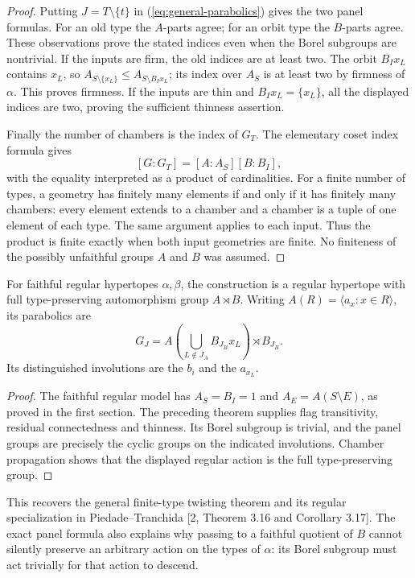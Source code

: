 \begin{proof}
Putting $J=T\setminus\{t\}$ in
(\ref{eq:general-parabolics}) gives the two panel formulas.
For an old type the $A$-parts agree; for an orbit type the $B$-parts
agree. These observations prove the stated indices even when the
Borel subgroups are nontrivial. If the inputs are firm, the old indices
are at least two. The orbit $B_Ix_L$ contains $x_L$, so
$A_{S\setminus\{x_L\}}\leq A_{S\setminus B_Ix_L}$; its index over
$A_S$ is at least two by firmness of $\alpha$. This proves firmness.
If the inputs are thin and $B_Ix_L=\{x_L\}$, all the displayed
indices are two, proving the sufficient thinness assertion.

Finally the number of chambers is the index of $G_T$. The elementary
coset index formula gives
\[
 [G:G_T]=[A:A_S][B:B_I],
\]
with the equality interpreted as a product of cardinalities.
For a finite number of types, a geometry has finitely many elements
if and only if it has finitely many chambers: every element extends
to a chamber and a chamber is a tuple of one element of each type.
The same argument applies to each input. Thus the product is finite
exactly when both input geometries are finite. No finiteness of the
possibly unfaithful groups $A$ and $B$ was assumed.
\end{proof}

\begin{corollary}\label{thm:twist}
For faithful regular hypertopes $\alpha,\beta$, the construction is a
regular hypertope with full type-preserving automorphism group $A\rtimes B$.
Writing $A(R)=\langle a_x:x\in R\rangle$, its parabolics are
\begin{equation}\label{eq:regular-support}
 G_J=A\!\left(\bigcup_{L\notin J_A}B_{J_B}x_L\right)\rtimes B_{J_B}.
\end{equation}
Its distinguished involutions are the $b_i$ and the $a_{x_L}$.
\end{corollary}
\begin{proof}
The faithful regular model has $A_S=B_I=1$ and
$A_E=A(S\setminus E)$, as proved in the first section. The preceding
theorem supplies flag transitivity, residual connectedness and thinness.
Its Borel subgroup is trivial, and the panel groups are precisely the
cyclic groups on the indicated involutions. Chamber propagation shows
that the displayed regular action is the full type-preserving group.
\end{proof}
This recovers the general finite-type twisting theorem and its regular
specialization in Piedade--Tranchida [2, Theorem 3.16 and Corollary 3.17].
The exact panel formula also explains why passing to a faithful quotient
of $B$ cannot silently preserve an arbitrary action on the types of
$\alpha$: its Borel subgroup must act trivially for that action to descend.
